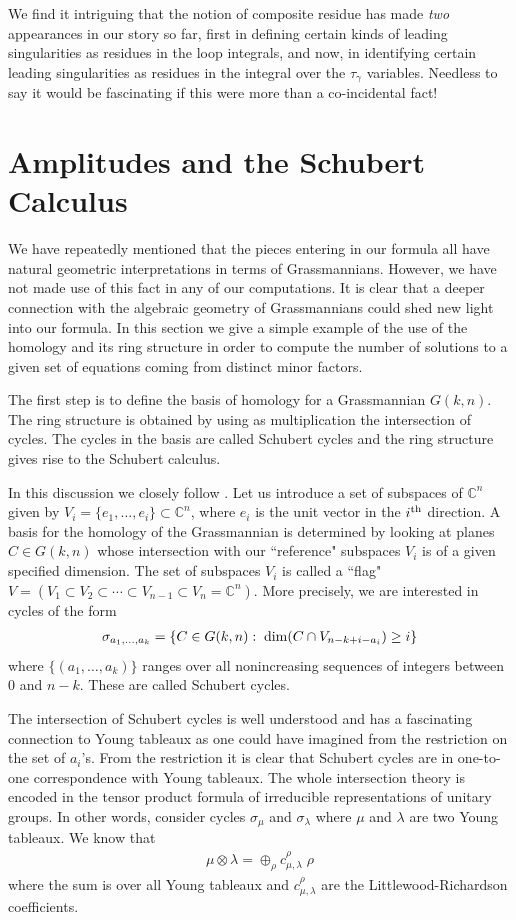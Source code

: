 \documentclass[12pt]{article}
\newcommand{\be}{\begin{eqnarray}}
\newcommand{\ee}{\end{eqnarray}}
\begin{document}
We find it intriguing that the notion of composite residue has made
{\it two} appearances in our story so far, first in defining certain
kinds of leading singularities as residues in the loop integrals,
and now, in identifying certain leading singularities as residues in
the integral over the $\tau_\gamma$ variables. Needless to say it
would be fascinating if this were more than a co-incidental fact!

\section{Amplitudes and the Schubert Calculus}
\label{sec:SchubCalc}

We have repeatedly mentioned that the pieces entering in our formula all have natural geometric interpretations in terms of Grassmannians. However, we have not made use of this fact in any of our computations. It is clear that a deeper connection with the algebraic geometry of Grassmannians could shed new light into our formula. In this section we give a simple example of the use of the homology and its ring structure in order to compute the number of solutions to a given set of equations coming from distinct minor factors.

The first step is to define the basis of homology for a Grassmannian $G(k,n)$. The ring structure is obtained by using as multiplication the intersection of cycles. The cycles in the basis are called Schubert cycles and the ring structure gives rise to the Schubert calculus.

In this discussion we closely follow \cite{GH}. Let us introduce a set of subspaces of $\mathbb{C}^n$ given by $V_i=\{e_1,\ldots , e_i\} \subset \mathbb{C}^n$, where $e_i$ is the unit vector in the $i^{\rm th}$ direction. A basis for the homology of the Grassmannian is determined by looking at planes $C\in G(k,n)$ whose intersection with our ``reference" subspaces $V_i$ is of a given specified dimension. The set of subspaces $V_i$ is called a ``flag" $V=(V_1\subset V_2 \subset \cdots \subset V_{n-1}\subset V_n = \mathbb{C}^n)$. More precisely, we are interested in cycles of the form
%
\be
\sigma_{a_1,\ldots, a_k} = \{ C \in G(k,n): \; {\rm dim}(C \cap V_{n-k+i-a_i}) \geq i\}
\ee
%
where $\{(a_1,\ldots ,a_k)\}$ ranges over all nonincreasing sequences of integers between $0$ and $n-k$. These are called Schubert cycles.

The intersection of Schubert cycles is well understood and has a fascinating connection to Young tableaux as one could have imagined from the restriction on the set of $a_i$'s. From the restriction it is clear that Schubert cycles are in one-to-one correspondence with Young tableaux. The whole intersection theory is encoded in the tensor product formula of irreducible representations of unitary groups. In other words, consider cycles $\sigma_\mu$ and $\sigma_\lambda$ where $\mu$ and $\lambda$ are two Young tableaux. We know that
%
\be
\mu \otimes \lambda = \oplus_\rho c_{\mu,\lambda}^\rho \; \rho
\ee
%
where the sum is over all Young tableaux and $c_{\mu,\lambda}^\rho$ are the Littlewood-Richardson coefficients.
\end{document}
